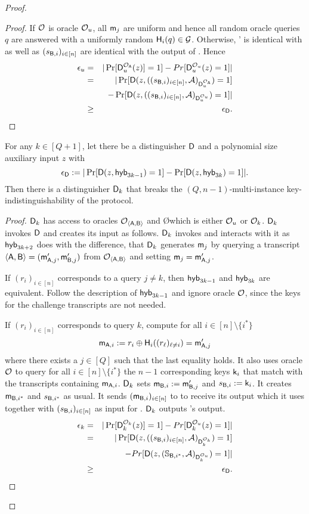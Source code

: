 \begin{proof}
\begin{proof}
If $\mathcal{O}$ is oracle $\mathcal{O}_{u}$, all $\mathsf{m}_j$ are uniform and hence all random oracle queries $q$ are answered with a uniformly random $\mathsf{H}_i(q)\in\mathcal{G}$.  Otherwise, \Adv' is identical with \send as well as $(s_{\mathsf{B},i})_{i\in[n]}$ are identical with the output of \send.  
Hence 
\begin{eqnarray*}
\epsilon_{u}&=&|\Pr[\mathsf D_u^{\mathcal{O}_{\mathsf{A}}}(z)]=1]-Pr[\mathsf D_u^{\mathcal{O}_{u}}(z)=1]|\\
&= &|\Pr[\mathsf D(z,((s_{\mathsf{B},i})_{i\in[n]},\mathcal{A})_{\mathsf D_u^{\mathcal{O}_{\mathsf{A}}}})=1]\\
&&-\Pr[\mathsf D(z,((s_{\mathsf{B},i})_{i\in[n]},\mathcal{A})_{\mathsf D_u^{\mathcal{O}_{u}}})=1]|\\
&\geq&\epsilon_{\mathsf D}.
\end{eqnarray*}
\pe
\end{proof}


\begin{claim}
For any $k\in[Q+1]$, let there be a distinguisher $\mathsf D$ and a polynomial size auxiliary input $z$ with
$$
\epsilon_{\mathsf D}:=|\Pr[\mathsf D(z,\mathsf{hyb}_{3k-1})=1] -\Pr[\mathsf D(z,\mathsf{hyb}_{3k})=1]|.
$$
Then there is a distinguisher $\mathsf D_k$ that breaks the $(Q,n-1)$-multi-instance key-indistinguishability of the \UKA protocol.
\end{claim}

\begin{proof}
$\mathsf D_k$ has access to oracles $\mathcal{O}_{\langle \mathsf{A},\mathsf{B}\rangle}$ and \O which is either $\mathcal{O}_u$ or $\mathcal{O}_k$. $\mathsf D_k$ invokes $\mathsf D$ and creates its input as follows. $\mathsf D_k$ invokes \Adv and interacts with it as $\mathsf{hyb}_{3k+2}$ does with the difference, that $\mathsf D_k$ generates $\mathsf{m}_j$ by querying a transcript $\langle \mathsf{A}, \mathsf{B}\rangle=(\mathsf{m}_{\mathsf{A},j}',\mathsf{m}_{\mathsf{B},j}')$ from $\mathcal{O}_{\langle \mathsf{A},\mathsf{B}\rangle}$ and setting $\mathsf{m}_j=\mathsf{m}_{\mathsf{A},j}'$. 

If $(r_i)_{i\in[n]}$ corresponds to a query $j\neq k$, then $\mathsf{hyb}_{3k-1}$ and $\mathsf{hyb}_{3k}$ are equivalent. Follow the description of $\mathsf{hyb}_{3k-1}$ and ignore oracle $\mathcal{O}$, since the keys for the challenge transcripts are not needed.

If $(r_i)_{i\in[n]}$ corresponds to query $k$,
compute for all $i\in[n]\setminus\{i^*\}$
$$
\mathsf{m}_{\mathsf{A},i}:=r_i\oplus\mathsf{H}_i((r_{\ell})_{\ell\neq i})=\mathsf{m}_{\mathsf{A},j}'
$$
where there exists a $j\in[Q]$ such that the last equality holds. It also uses oracle $\mathcal{O}$ to query for all $i\in[n]\setminus\{i^*\}$ the $n-1$ corresponding keys $\mathsf{k}_i$ that match with the transcripts containing $\mathsf{m}_{\mathsf{A},i}$. $\mathsf D_k$ sets $\mathsf{m}_{\mathsf{B},i}:=\mathsf{m}_{\mathsf{B},j}'$ and $s_{\mathsf{B},i}:=\mathsf{k}_i$. It creates $\mathsf{m}_{\mathsf{B},i^*}$ and $s_{\mathsf{B},i^*}$ as usual. It sends $(\mathsf{m}_{\mathsf{B},i})_{i\in[n]}$ to \Adv to receive its output which it uses together with $(s_{\mathsf{B},i})_{i\in[n]}$ as input for \D. $\mathsf D_k$ outputs \D's output.  
\begin{eqnarray*}
\epsilon_{k}&=&|\Pr[\mathsf D_k^{\mathcal{O}_{k}}(z)]=1]-Pr[\mathsf D_k^{\mathcal{O}_{u}}(z)=1]|\\
&= &|\Pr[\mathsf D(z,((s_{\mathsf{B},i})_{i\in[n]},\mathcal{A})_{\mathsf D_k^{\mathcal{O}_{k}}})=1]\\
&&-Pr[\mathsf D(z,(\mathsf{\mathbb S}_{\mathsf{B},i^*},\mathcal{A})_{\mathsf D_k^{\mathcal{O}_{u}}})=1]|\\
&\geq&\epsilon_{\mathsf D}.
\end{eqnarray*}
\pe
\end{proof}


\end{proof}
